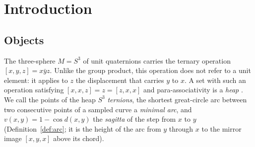 \documentclass[11pt,reqno]{amsart}
\theoremstyle{definition}
\theoremstyle{remark}
\numberwithin{equation}{section}
\newcommand{\hp}[3]{[#1,#2,#3]}
\begin{document}
\maketitle

\section{Introduction}\label{sec:intro}

\subsection{Objects}
The three-sphere $M=S^3$ of unit quaternions carries the ternary operation $\hp xyz=x\bar yz$.  Unlike
the group product, this operation does not refer to a unit element: it applies to $z$ the displacement
that carries $y$ to $x$.  A set with such an operation satisfying $\hp xxz=z=\hp zxx$ and
para-associativity is a \emph{heap} \cite{Prufer,Baer,Certaine}.  We call the points of the heap $S^3$ \emph{ternions}, the shortest
great-circle arc between two consecutive points of a sampled curve a \emph{minimal arc}, and
$v(x,y)=1-\cos d(x,y)$ the \emph{sagitta} of the step from $x$ to $y$ (Definition~\ref{def:arc}; it is
the height of the arc from $y$ through $x$ to the mirror image $\hp xyx$ above its chord).
\end{document}
